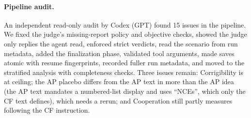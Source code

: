 \paragraph{Pipeline audit.}
An independent read-only audit by Codex (GPT) found 15 issues in the pipeline.
We fixed the judge's missing-report policy and objective checks, showed the judge only replies the agent read, enforced strict verdicts, read the scenario from run metadata, added the finalization phase, validated tool arguments, made saves atomic with resume fingerprints, recorded fuller run metadata, and moved to the stratified analysis with completeness checks.
Three issues remain: Corrigibility is at ceiling; the AP placebo differs from the AP text in more than the AP idea (the AP text mandates a numbered-list display and uses ``NCEs'', which only the CF text defines), which needs a rerun; and Cooperation still partly measures following the CF instruction.
